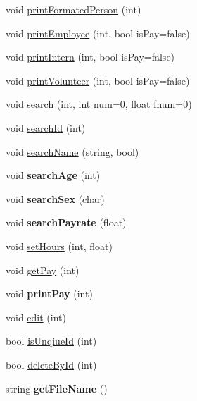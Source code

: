 \begin{DoxyCompactItemize}
\item 
void \hyperlink{class_data_a440aac15cbe9f6880cd12c748525f17d}{print\+Formated\+Person} (int)
\item 
void \hyperlink{class_data_aa8b777e5d9faa7b486fd8cca18f62133}{print\+Employee} (int, bool is\+Pay=false)
\item 
void \hyperlink{class_data_aeff0cd207b46e29ba434375bc1a09dbb}{print\+Intern} (int, bool is\+Pay=false)
\item 
void \hyperlink{class_data_afe7fd9080d964dfc23606b7dc66a079c}{print\+Volunteer} (int, bool is\+Pay=false)
\item 
void \hyperlink{class_data_a057b785406e61292efe2b44789f44e6e}{search} (int, int num=0, float fnum=0)
\item 
void \hyperlink{class_data_a89e42650cc16a2526fb96f5eda7c5997}{search\+Id} (int)
\item 
void \hyperlink{class_data_a7cd3eb934ed943004d4b673f754eb705}{search\+Name} (string, bool)
\item 
\hypertarget{class_data_a2706e62b1c2dca261cdd2b7c5086e0fe}{void {\bfseries search\+Age} (int)}\label{class_data_a2706e62b1c2dca261cdd2b7c5086e0fe}

\item 
\hypertarget{class_data_a11ac5e9f4b9ea5e077d8b54b2734c8d9}{void {\bfseries search\+Sex} (char)}\label{class_data_a11ac5e9f4b9ea5e077d8b54b2734c8d9}

\item 
\hypertarget{class_data_aff43a577ffcf743a1a8774cc890063c2}{void {\bfseries search\+Payrate} (float)}\label{class_data_aff43a577ffcf743a1a8774cc890063c2}

\item 
void \hyperlink{class_data_aa118b49b16e377dad9757aa3fd3adbd2}{set\+Hours} (int, float)
\item 
void \hyperlink{class_data_a1ee81bc520e8c4194f9535277e4bbda0}{get\+Pay} (int)
\item 
\hypertarget{class_data_abaa52e627b7d2fe7b868c7e1e8d59db5}{void {\bfseries print\+Pay} (int)}\label{class_data_abaa52e627b7d2fe7b868c7e1e8d59db5}

\item 
void \hyperlink{class_data_ae968bc2f692e1d9ac23511e1dde55d9c}{edit} (int)
\item 
bool \hyperlink{class_data_a9819ecf70fc364a952eb5a6bf488481f}{is\+Unqiue\+Id} (int)
\item 
bool \hyperlink{class_data_ad2ecdad835bcc4986ce6f44aac4cc7d2}{delete\+By\+Id} (int)
\item 
\hypertarget{class_data_affcf8857c10d2bb5643dab47612a4fcf}{string {\bfseries get\+File\+Name} ()}\label{class_data_affcf8857c10d2bb5643dab47612a4fcf}


\end{DoxyCompactItemize}
